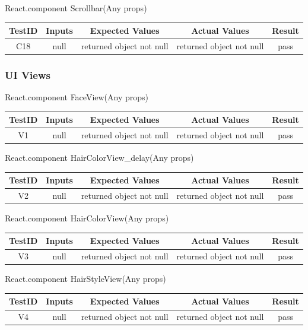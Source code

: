 \documentclass[12pt, oneside, openany, titlepage]{article}
\begin{document}
React.component Scrollbar(Any props) \\
\begin{tabular}{ |c|c|c|c|c| } 
 \hline
 TestID & Inputs & Expected Values & Actual Values & Result \\ 
 \hline
 C18 & null & returned object not null & returned object not null & pass \\ 
 \hline
\end{tabular}

\subsubsection{UI Views}
React.component FaceView(Any props) \\
\begin{tabular}{ |c|c|c|c|c| } 
 \hline
 TestID & Inputs & Expected Values & Actual Values & Result \\ 
 \hline
 V1 & null & returned object not null & returned object not null & pass \\ 
 \hline
\end{tabular}

React.component HairColorView\_delay(Any props) \\
\begin{tabular}{ |c|c|c|c|c| } 
 \hline
 TestID & Inputs & Expected Values & Actual Values & Result \\ 
 \hline
 V2 & null & returned object not null & returned object not null & pass \\ 
 \hline
\end{tabular}

React.component HairColorView(Any props) \\
\begin{tabular}{ |c|c|c|c|c| } 
 \hline
 TestID & Inputs & Expected Values & Actual Values & Result \\ 
 \hline
 V3 & null & returned object not null & returned object not null & pass \\ 
 \hline
\end{tabular}

React.component HairStyleView(Any props) \\
\begin{tabular}{ |c|c|c|c|c| } 
 \hline
 TestID & Inputs & Expected Values & Actual Values & Result \\ 
 \hline
 V4 & null & returned object not null & returned object not null & pass \\ 
 \hline
\end{tabular}
\end{document}
